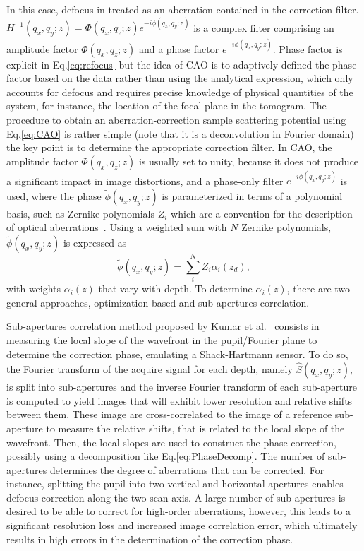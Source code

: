 In this case, defocus in treated as an aberration contained in the correction filter. $H^{-1}(q_x, q_y; z) = \Phi(q_x,q_z;z) e^{-i\phi(q_x, q_y; z)}$ is a complex filter comprising an amplitude factor $\Phi(q_x,q_z;z)$ and a phase factor $e^{-i\phi(q_x, q_y; z)}$. Phase factor is explicit in Eq.\eqref{eq:refocus} but the idea of CAO is to adaptively defined the phase factor based on the data rather than using the analytical expression, which only accounts for defocus and requires precise knowledge of physical quantities of the system, for instance, the location of the focal plane in the tomogram. The procedure to obtain an aberration-correction sample scattering potential using Eq.\eqref{eq:CAO} is rather simple (note that it is a deconvolution in Fourier domain) the key point is to determine the appropriate correction filter. In CAO, the amplitude factor $\Phi(q_x,q_z;z)$ is usually set to unity, because it does not produce a significant impact in image distortions, and a phase-only filter $e^{-i\tilde{\phi}(q_x, q_y; z)}$ is used, where the phase $\tilde{\phi}(q_x, q_y; z)$ is parameterized in terms of a polynomial basis, such as Zernike polynomials $Z_i$ which are a convention for the description of optical aberrations~\cite{}. Using a weighted sum with $N$ Zernike polynomials, $\tilde{\phi}(q_x, q_y; z)$ is expressed as
\begin{equation}\label{eq:PhaseDecomp}
	\tilde{\phi}(q_x, q_y; z) = \sum_i^N Z_i\alpha_i(z_d),
\end{equation} 
with weights $\alpha_i(z)$ that vary with depth. To determine $\alpha_i(z)$, there are two general approaches, optimization-based and sub-apertures correlation. 

Sub-apertures correlation method proposed by Kumar et al.~\cite{} consists in measuring the local slope of the wavefront in the pupil/Fourier plane to determine the correction phase, emulating a Shack-Hartmann sensor. To do so, the Fourier transform of the acquire signal for each depth, namely $\hat{S}(q_x, q_y; z)$, is split into sub-apertures and the inverse Fourier transform of each sub-aperture is computed to yield images that will exhibit lower resolution and relative shifts between them. These image are cross-correlated to the image of a reference sub-aperture to measure the relative shifts, that is related to the local slope of the wavefront. Then, the local slopes are used to construct the phase correction, possibly using a decomposition like Eq.\eqref{eq:PhaseDecomp}. The number of sub-apertures determines the degree of aberrations that can be corrected. For instance, splitting the pupil into two vertical and horizontal apertures enables defocus correction along the two scan axis. A large number of sub-apertures is desired to be able to correct for high-order aberrations, however, this leads to a significant resolution loss and increased image correlation error, which ultimately results in high errors in the determination of the correction phase.

